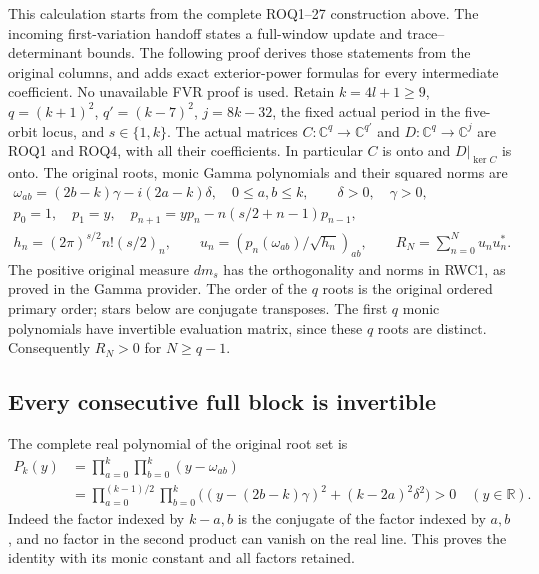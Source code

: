 \documentclass[11pt,a4paper]{article}
\begin{document}
This calculation starts from the complete ROQ1--27 construction above.
The incoming first-variation handoff states a full-window update and
trace--determinant bounds. The following proof derives those statements
from the original columns, and adds exact exterior-power formulas for
every intermediate coefficient. No unavailable FVR proof is used.
Retain $k=4l+1\ge9$, $q=(k+1)^2$, $q'=(k-7)^2$, $j=8k-32$,
the fixed actual period in the five-orbit locus, and $s\in\{1,k\}$.
The actual matrices $C:\mathbb C^q\to\mathbb C^{q'}$ and
$D:\mathbb C^q\to\mathbb C^j$ are ROQ1 and ROQ4, with all their
coefficients. In particular $C$ is onto and $D|_{\ker C}$ is onto.
The original roots, monic Gamma polynomials and their squared norms are
\begin{equation}\tag{RWC1}
\begin{gathered}
\omega_{ab}=(2b-k)\gamma-i(2a-k)\delta,\quad 0\le a,b\le k,
\qquad \delta>0,\quad\gamma>0,\\
p_0=1,\quad p_1=y,\quad
p_{n+1}=yp_n-n(s/2+n-1)p_{n-1},\\
h_n=(2\pi)^{s/2}n!(s/2)_n,\qquad
u_n=(p_n(\omega_{ab})/\sqrt{h_n})_{ab},\qquad
R_N=\sum_{n=0}^N u_nu_n^*.
\end{gathered}
\end{equation}
The positive original measure $dm_s$ has the orthogonality and norms
in RWC1, as proved in the Gamma provider. The order of the $q$ roots
is the original ordered primary order; stars below are conjugate
transposes. The first $q$ monic polynomials have invertible evaluation
matrix, since these $q$ roots are distinct. Consequently $R_N>0$
for $N\ge q-1$.

\subsection{Every consecutive full block is invertible}
The complete real polynomial of the original root set is
\begin{equation}\tag{RWC2}
\begin{split}
P_k(y)&=\prod_{a=0}^k\prod_{b=0}^k(y-\omega_{ab})\\
&=\prod_{a=0}^{(k-1)/2}\prod_{b=0}^k
\bigl((y-(2b-k)\gamma)^2+(k-2a)^2\delta^2\bigr)>0
\quad(y\in\mathbb R).
\end{split}
\end{equation}
Indeed the factor indexed by $k-a,b$ is the conjugate of the
factor indexed by $a,b$, and no factor in the second product can
vanish on the real line. This proves the identity with its monic
constant and all factors retained.
\end{document}
